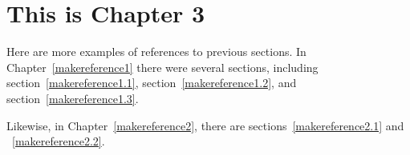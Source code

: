 
\cleardoublepage


\chapter{This is Chapter 3}
\label{makereference3}

Here are more examples of references to previous sections.  In
Chapter~\ref{makereference1} there were several sections, including
section~\ref{makereference1.1}, section~\ref{makereference1.2}, and
section~\ref{makereference1.3}.

Likewise, in Chapter~\ref{makereference2}, there are
sections~\ref{makereference2.1} and ~\ref{makereference2.2}.
